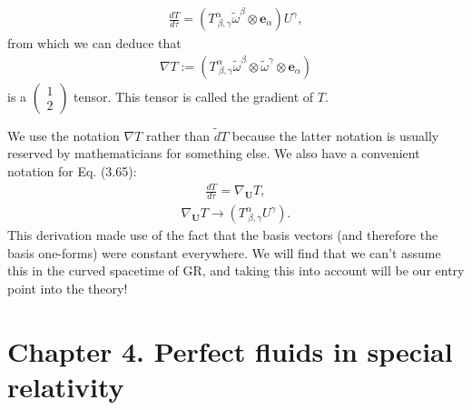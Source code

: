 \documentclass[12pt]{book}
\begin{document}
    \begin{align}
    \frac{dT}{d\tau} = \left(T^\alpha_{\ \beta, \gamma} \tilde{\omega}^\beta \otimes \mathbf{e}_\alpha\right) U^\gamma, \tag{3.65}
    \end{align}
    from which we can deduce that
    \begin{align}
    \nabla T := \left(T^\alpha_{\ \beta, \gamma} \tilde{\omega}^\beta \otimes \tilde{\omega}^\gamma \otimes \mathbf{e}_\alpha\right) \tag{3.66}
    \end{align}
    is a \(\left(\begin{array}{c} 1 \\ 2 \end{array}\right)\) tensor. This tensor is called the gradient of \(T\).
    
    We use the notation \(\nabla T\) rather than \(\tilde{d}T\) because the latter notation is usually reserved by mathematicians for something else. We also have a convenient notation for Eq. (3.65):
    \begin{align}
    \frac{dT}{d\tau} = \nabla_{\mathbf{U}} T, \tag{3.67}
    \end{align}
    \begin{align}
    \nabla_{\mathbf{U}} T \rightarrow \left(T^\alpha_{\ \beta, \gamma} U^\gamma\right). \tag{3.68}
    \end{align}
    This derivation made use of the fact that the basis vectors (and therefore the basis one-forms) were constant everywhere. We will find that we can’t assume this in the curved spacetime of GR, and taking this into account will be our entry point into the theory!
    
\section{Chapter 4. Perfect fluids in special relativity}
\end{document}
